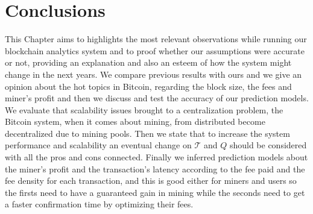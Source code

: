 \documentclass[USenglish]{uit-thesis}
\begin{document}
\chapter{Conclusions}
\label{chap:conclusion}
This Chapter aims to highlights the most relevant
observations while running our blockchain analytics
system and to proof whether our assumptions were
accurate or not, providing an explanation and also an
esteem of how the system might change in the next years.
We compare previous results with ours and we give
an opinion about the hot topics in Bitcoin, regarding
the block size, the fees and miner's profit and then we
discuss and test the accuracy of our prediction models.
We evaluate that scalability issues brought to a 
centralization problem, the Bitcoin system, when it comes
about mining, from distributed
become decentralized due to mining pools.
Then we state that to increase the system performance and
scalability an eventual change on $\mathcal{T}$
and $Q$ should be considered with all the pros and
cons connected.
Finally we inferred prediction models about the
miner's profit and the transaction's latency according
to the fee paid and the fee density for each
transaction, and this is good either for
miners and users so the firsts need
to have a guaranteed gain in mining while
the seconds need to get a faster
confirmation time by optimizing
their fees.
\end{document}

